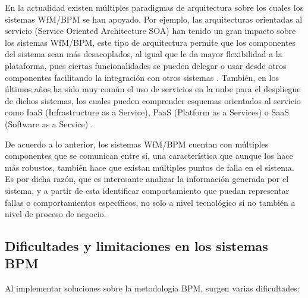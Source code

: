 En la actualidad existen múltiples paradigmas de arquitectura sobre los cuales los sistemas WfM/BPM se han apoyado. Por ejemplo, las arquitecturas orientadas al servicio (Service Oriented Architecture SOA) han tenido un gran impacto sobre los sistemas WfM/BPM, este tipo de arquitectura permite que los componentes del sistema sean más desacoplados, al igual que le da mayor flexibilidad a la plataforma, pues ciertas funcionalidades se pueden delegar o usar desde otros componentes facilitando la integración con otros sistemas \cite{VanderAalst2013}. También, en los últimos años ha sido muy común el uso de servicios en la nube para el despliegue de dichos sistemas, los cuales pueden comprender esquemas orientados al servicio como IaaS (Infrastructure as a Service), PaaS (Platform as a Services) o SaaS (Software as a Service) \cite{VanderAalst2013}. 

De acuerdo a lo anterior, los sistemas WfM/BPM cuentan con múltiples componentes que se comunican entre sí, una característica que aunque los hace más robustos, también hace que existan múltiples puntos de falla en el sistema. Es por dicha razón, que es interesante analizar la información generada por el sistema, y a partir de esta identificar comportamiento que puedan representar fallas o comportamientos específicos, no solo a nivel tecnológico si no también a nivel de proceso de negocio.

\subsection{Dificultades y limitaciones en los sistemas BPM} %
\label{section1.2.1}

Al implementar soluciones sobre la metodología BPM, surgen varias dificultades:

